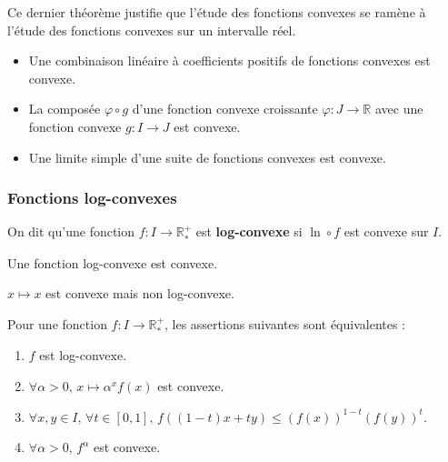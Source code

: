   Ce dernier théorème justifie que l'étude des fonctions convexes se ramène à l'étude des fonctions convexes sur un intervalle réel.

  \begin{proposition}
    \begin{itemize}
      \item Une combinaison linéaire à coefficients positifs de fonctions convexes est convexe.
      \item La composée $\varphi \circ g$ d'une fonction convexe croissante $\varphi : J \rightarrow \mathbb{R}$ avec une fonction convexe $g : I \rightarrow J$ est convexe.
      \item Une limite simple d'une suite de fonctions convexes est convexe.
    \end{itemize}
  \end{proposition}

  \subsubsection{Fonctions log-convexes}


  \begin{definition}
    On dit qu'une fonction $f : I \rightarrow \mathbb{R}^+_*$ est \textbf{log-convexe} si $\ln \circ f$ est convexe sur $I$.
  \end{definition}

  \begin{proposition}
    Une fonction log-convexe est convexe.
  \end{proposition}

  \begin{cexample}
    $x \mapsto x$ est convexe mais non log-convexe.
  \end{cexample}

  \begin{theorem}
    Pour une fonction $f : I \rightarrow \mathbb{R}^+_*$, les assertions suivantes sont équivalentes :
    \begin{enumerate}[label={\bfseries(\roman*)}]
      \item $f$ est log-convexe.
      \item $\forall \alpha > 0, \, x \mapsto \alpha^x f(x)$ est convexe.
      \item $\forall x, y \in I, \, \forall t \in [0,1], \, f((1-t)x + ty) \leq (f(x))^{1-t} (f(y))^t$.
      \item $\forall \alpha > 0, \, f^\alpha$ est convexe.
    \end{enumerate}
  \end{theorem}

